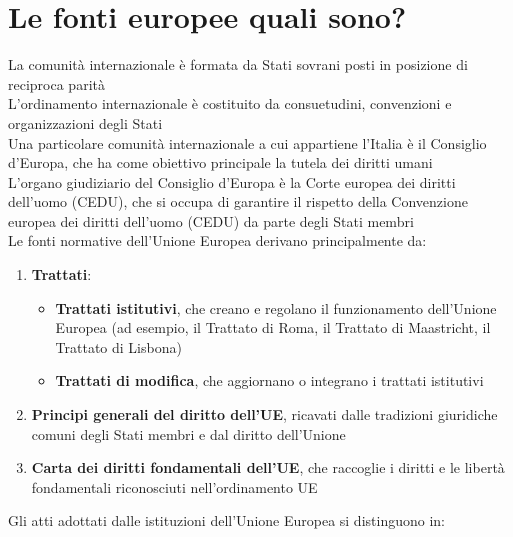 \documentclass[8pt,oneside,a4paper]{article}
\begin{document}
	\section{Le fonti europee quali sono?}
	La comunità internazionale è formata da Stati sovrani posti in posizione di reciproca parità\\
	L'ordinamento internazionale è costituito da consuetudini, convenzioni e organizzazioni degli Stati\\
	Una particolare comunità internazionale a cui appartiene l'Italia è il Consiglio d'Europa, che ha come obiettivo principale la tutela dei diritti umani\\
	L'organo giudiziario del Consiglio d'Europa è la Corte europea dei diritti dell’uomo (CEDU), che si occupa di garantire il rispetto della Convenzione europea dei diritti dell'uomo (CEDU) da parte degli Stati membri\\
	Le fonti normative dell'Unione Europea derivano principalmente da:  
	\begin{enumerate}
		\item \textbf{Trattati}:  
		\begin{itemize}
			\item \textbf{Trattati istitutivi}, che creano e regolano il funzionamento dell’Unione Europea (ad esempio, il Trattato di Roma, il Trattato di Maastricht, il Trattato di Lisbona)
			\item \textbf{Trattati di modifica}, che aggiornano o integrano i trattati istitutivi
		\end{itemize}
		\item \textbf{Principi generali del diritto dell'UE}, ricavati dalle tradizioni giuridiche comuni degli Stati membri e dal diritto dell’Unione
		\item \textbf{Carta dei diritti fondamentali dell'UE}, che raccoglie i diritti e le libertà fondamentali riconosciuti nell’ordinamento UE
	\end{enumerate}
	Gli atti adottati dalle istituzioni dell'Unione Europea si distinguono in:  
\end{document}
